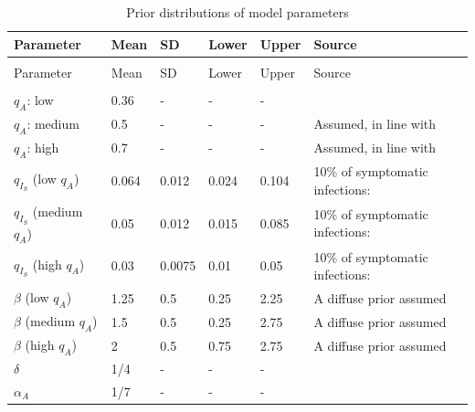 \documentclass[11pt]{article}
\begin{document}
\begin{spacing}{.9}
	\begin{longtable}[H] {p{} p{} p{} p{} p{} p{} }
		\caption{Prior distributions of model parameters} \\
		Parameter & Mean & SD & Lower & Upper & Source   \\[0.5em] \hline
		{} & {} & {} & {} & {} & {} \\
		\endfirsthead
		Parameter & Mean & SD & Lower & Upper & Source  \\[0.5em] \hline
		{} & {} & {} & {} & {} & {}  \\
		\endhead
		$q_A$: low & 0.36 & {-} & {-} & {-} & \citep{nishiura2020estimation, mizumoto2020estimating, russell2020estimating}  \\[0.5em]
		$q_A$: medium & 0.5 & {-} & {-} & {-} & Assumed, in line with \citep{he2020estimation, emery2020contribution, kimball2020asymptomatic} \\[0.5em]
		$q_A$: high & 0.7  & {-} & {-} & {-} & Assumed, in line with \citep{he2020estimation, emery2020contribution, kimball2020asymptomatic} \\[0.5em]
		$q_{I_S}$ (low $q_A$) & 0.064 & 0.012 & 0.024 & 0.104 & 10\% of symptomatic infections: \citep{verity2020estimates, bi2020epidemiology, salje2020estimating} \\[0.5em]
		$q_{I_S}$ (medium $q_A$) & 0.05 & 0.012 & 0.015 & 0.085 & 10\% of symptomatic infections: \citep{verity2020estimates, bi2020epidemiology, salje2020estimating} \\[0.5em]
		$q_{I_S}$ (high $q_A$) & 0.03 & 0.0075 & 0.01 & 0.05 & 10\% of symptomatic infections: \citep{verity2020estimates, bi2020epidemiology, salje2020estimating} \\[0.5em]
		$\beta$ (low $q_A$) & 1.25 & 0.5 & 0.25 & 2.25 & A diffuse prior assumed \\[0.5em]
		$\beta$ (medium $q_A$) & 1.5 & 0.5 & 0.25 & 2.75 & A diffuse prior assumed \\[0.5em]
		$\beta$ (high $q_A$) & 2 & 0.5 & 0.75 & 2.75 & A diffuse prior assumed \\[0.5em]
		$\delta$ & 1/4 & {-} & {-} & {-} & \citep{lauer2020incubation, bi2020epidemiology, li2020early, linton2020incubation, he2020estimation, salje2020estimating, wei2020presymptomatic} \\[0.5em]
		$\alpha_A$ & 1/7 & {-} & {-} & {-} & \citep{wolfel2020virological} \\[0.5em]

\end{longtable}
\end{spacing}
\end{document}
